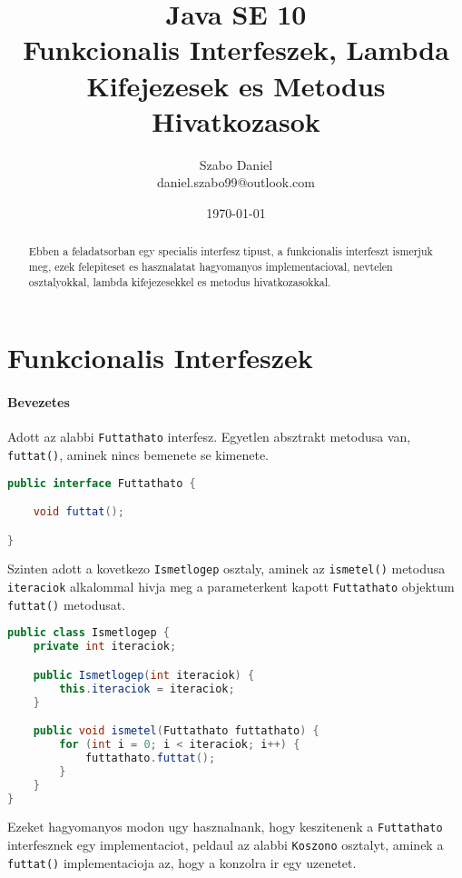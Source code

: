 \documentclass{article}
\title{%
Java SE 10 \\
\large Funkcionalis Interfeszek, Lambda Kifejezesek es Metodus Hivatkozasok}
\author{Szabo Daniel\\daniel.szabo99@outlook.com}
\date{\today}
\let\l\lstinline
\begin{document}
\maketitle
\begin{abstract}
Ebben a feladatsorban egy specialis interfesz tipust, a funkcionalis interfeszt ismerjuk meg, ezek felepiteset es hasznalatat hagyomanyos implementacioval, nevtelen osztalyokkal, lambda kifejezesekkel es metodus hivatkozasokkal.
\end{abstract}

\newpage

\tableofcontents{}

\newpage

\section{Funkcionalis Interfeszek}
\paragraph{Bevezetes}

Adott az alabbi \l{Futtathato} interfesz. Egyetlen absztrakt metodusa van, \l{futtat()}, aminek nincs bemenete se kimenete.

\begin{lstlisting}[language=Java, caption=Futtathato interfesz]
public interface Futtathato {

	void futtat();

}
\end{lstlisting}

Szinten adott a kovetkezo \l{Ismetlogep} osztaly, aminek az \l{ismetel()} metodusa \l{iteraciok} alkalommal hivja meg a parameterkent kapott \l{Futtathato} objektum \l{futtat()} metodusat.

\begin{lstlisting}[language=Java, caption=Ismetlogep osztaly]
public class Ismetlogep {
	private int iteraciok;

	public Ismetlogep(int iteraciok) {
		this.iteraciok = iteraciok;
	}

	public void ismetel(Futtathato futtathato) {
		for (int i = 0; i < iteraciok; i++) {
			futtathato.futtat();
		}
	}
}
\end{lstlisting}

Ezeket hagyomanyos modon ugy hasznalnank, hogy keszitenenk a \l{Futtathato} interfesznek egy implementaciot, peldaul az alabbi \l{Koszono} osztalyt, aminek a \l{futtat()} implementacioja az, hogy a konzolra ir egy uzenetet.
\end{document}
